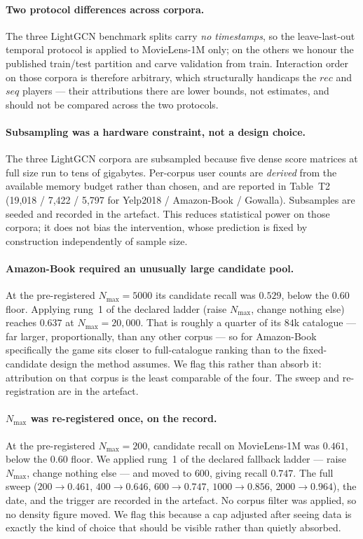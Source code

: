 \documentclass[11pt]{article}
\begin{document}
\paragraph{Two protocol differences across corpora.} The three LightGCN
benchmark splits carry \emph{no timestamps}, so the leave-last-out temporal
protocol is applied to MovieLens-1M only; on the others we honour the
published train/test partition and carve validation from train. Interaction
order on those corpora is therefore arbitrary, which structurally handicaps the
$rec$ and $seq$ players --- their attributions there are lower bounds, not
estimates, and should not be compared across the two protocols.

\paragraph{Subsampling was a hardware constraint, not a design choice.} The
three LightGCN corpora are subsampled because five dense score matrices at full
size run to tens of gigabytes. Per-corpus user counts are \emph{derived} from
the available memory budget rather than chosen, and are reported in Table~T2
(19{,}018 / 7{,}422 / 5{,}797 for Yelp2018 / Amazon-Book / Gowalla). Subsamples
are seeded and recorded in the artefact. This reduces statistical power on
those corpora; it does not bias the intervention, whose prediction is fixed by
construction independently of sample size.

\paragraph{Amazon-Book required an unusually large candidate pool.} At the
pre-registered $N_{\max} = 5000$ its candidate recall was $0.529$, below the
$0.60$ floor. Applying rung~1 of the declared ladder (raise $N_{\max}$, change
nothing else) reaches $0.637$ at $N_{\max} = 20{,}000$. That is roughly a
quarter of its $84$k catalogue --- far larger, proportionally, than any other
corpus --- so for Amazon-Book specifically the game sits closer to
full-catalogue ranking than to the fixed-candidate design the method assumes.
We flag this rather than absorb it: attribution on that corpus is the least
comparable of the four. The sweep and re-registration are in the artefact.

\paragraph{$N_{\max}$ was re-registered once, on the record.} At the
pre-registered $N_{\max} = 200$, candidate recall on MovieLens-1M was $0.461$,
below the $0.60$ floor. We applied rung~1 of the declared fallback ladder ---
raise $N_{\max}$, change nothing else --- and moved to $600$, giving recall
$0.747$. The full sweep ($200 \to 0.461$, $400 \to 0.646$, $600 \to 0.747$,
$1000 \to 0.856$, $2000 \to 0.964$), the date, and the trigger are recorded in
the artefact. No corpus filter was applied, so no density figure moved. We flag
this because a cap adjusted after seeing data is exactly the kind of choice
that should be visible rather than quietly absorbed.
\end{document}
